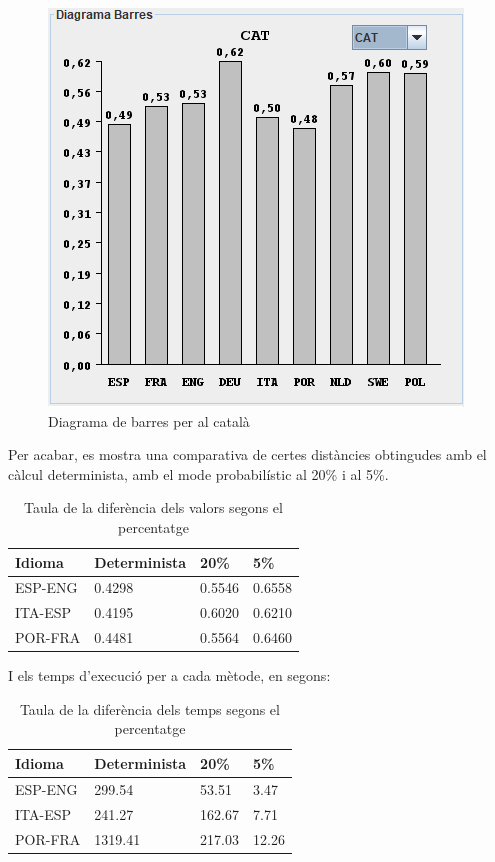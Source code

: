 \documentclass{ieeetj}
\begin{document}
\begin{figure}[H]
    \centering
    \includegraphics[width=\linewidth]{png/barres.png}
    \caption{Diagrama de barres per al català}
    \label{fig:enter-label}
\end{figure}

Per acabar, es mostra una comparativa de certes distàncies obtingudes amb el càlcul determinista, amb el mode probabilístic al 20\% i al 5\%.
\begin{table}[H]
    \centering
    \begin{tabular}{|l|l|l|l|}
        \hline
        \textbf {Idioma} & \textbf{Determinista} & \textbf{20\% } & \textbf{5\%} \\
        \hline
         ESP-ENG	 &0.4298 &0.5546	&0.6558 \\
         ITA-ESP	 &0.4195	 &0.6020	&0.6210 \\
         POR-FRA	 &0.4481 &0.5564	&0.6460 \\
        \hline
    \end{tabular}
    \vspace{3mm}
    \caption{Taula de la diferència dels valors segons el percentatge}
\end{table}

I els temps d'execució per a cada mètode, en segons:
\begin{table}[H]
    \centering
    \begin{tabular}{|l|l|l|l|}
        \hline
        \textbf {Idioma} & \textbf{Determinista} & \textbf{20\% } & \textbf{5\%} \\
        \hline
         ESP-ENG	 &299.54	&53.51	&3.47 \\
         ITA-ESP	 &241.27	&162.67	&7.71 \\
         POR-FRA	 &1319.41	&217.03	&12.26 \\
        \hline
    \end{tabular}
    \vspace{3mm}
    \caption{Taula de la diferència dels temps segons el percentatge}
\end{table}
\end{document}
